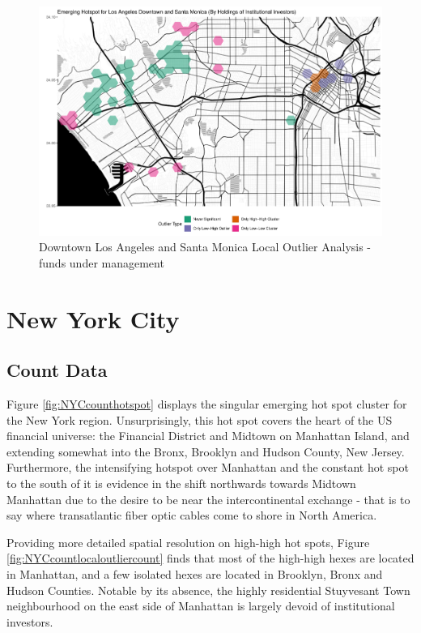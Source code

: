 \begin{figure}
	\centering
	\includegraphics[width=1\linewidth]{Figures/ChapterIV/LA_Money_LO_Downtown}
	\caption[Downtown Los Angeles and Santa Monica Local Outlier Analysis - Funds Under Management 2013-2018]{Downtown Los Angeles and Santa Monica Local Outlier Analysis - funds under management}
	\label{fig:LAlocaloutlier_Downtown}
\end{figure}

\section{New York City}

\subsection{Count Data}

Figure \ref{fig:NYCcounthotspot} displays the singular emerging hot spot cluster for the New York region.  Unsurprisingly, this hot spot covers the heart of the US financial universe: the Financial District and Midtown on Manhattan Island, and extending somewhat into the Bronx, Brooklyn and Hudson County, New Jersey.   Furthermore, the intensifying hotspot over Manhattan and the constant hot spot to the south of it is evidence in the shift northwards towards Midtown Manhattan due to the desire to be near the intercontinental exchange - that is to say where transatlantic fiber optic cables come to shore in North America.     

Providing more detailed spatial resolution on high-high hot spots, Figure \ref{fig:NYCcountlocaloutliercount} finds that most of the high-high hexes are located in Manhattan, and a few isolated hexes are located in Brooklyn, Bronx and Hudson Counties.  Notable by its absence, the highly residential Stuyvesant Town neighbourhood on the east side of Manhattan is largely devoid of institutional investors.      



